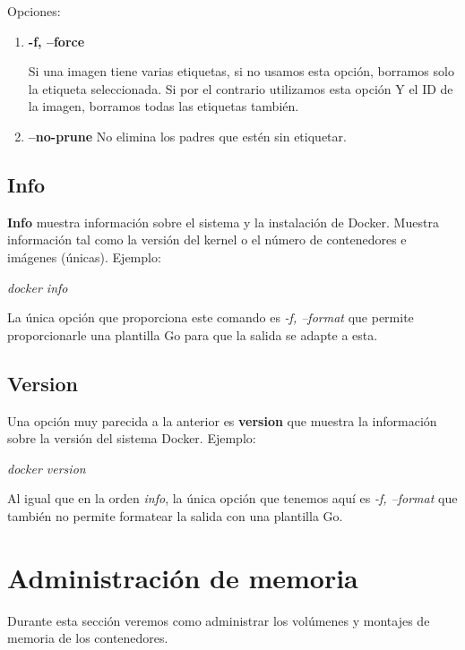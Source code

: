 \documentclass[]{article}
\begin{document}
Opciones:

\begin{enumerate}
\renewcommand{\labelenumi}{$\bullet$}
\item \textbf{-f, --force}

Si una imagen tiene varias etiquetas, si no usamos esta opción, borramos solo la etiqueta seleccionada.
Si por el contrario utilizamos esta opción Y el ID de la imagen, borramos todas las etiquetas también.

\item \textbf{--no-prune}
No elimina los padres que estén sin etiquetar.
\end{enumerate}


\subsection{Info}
\textbf{Info} muestra información sobre el sistema y la instalación de Docker.
Muestra información tal como la versión del kernel o el número de contenedores e imágenes (únicas).
Ejemplo:

\begin{center}
	\it
	docker info
\end{center}

La única opción que proporciona este comando es \textit{-f, --format} que permite proporcionarle una plantilla Go para que la salida se adapte a esta.


\subsection{Version}
Una opción muy parecida a la anterior es \textbf{version} que muestra la información sobre la versión del sistema Docker.
Ejemplo:
\begin{center}
	\it
	docker version
\end{center}

Al igual que en la orden \textit{info}, la única opción que tenemos aquí es \textit{-f, --format} que también no permite
formatear la salida con una plantilla Go.


\section{Administración de memoria}
Durante esta sección veremos como administrar los volúmenes y montajes de memoria de los contenedores.
\end{document}
